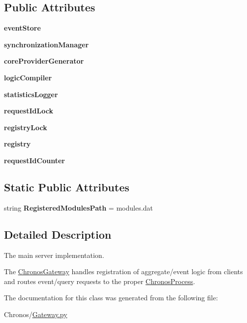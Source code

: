 \subsection*{Public Attributes}
\begin{DoxyCompactItemize}
\item 
{\bfseries event\+Store}
\item 
{\bfseries synchronization\+Manager}
\item 
{\bfseries core\+Provider\+Generator}
\item 
{\bfseries logic\+Compiler}
\item 
{\bfseries statistics\+Logger}
\item 
{\bfseries request\+Id\+Lock}
\item 
{\bfseries registry\+Lock}
\item 
{\bfseries registry}
\item 
{\bfseries request\+Id\+Counter}
\end{DoxyCompactItemize}
\subsection*{Static Public Attributes}
\begin{DoxyCompactItemize}
\item 
string {\bfseries Registered\+Modules\+Path} = \textquotesingle{}modules.\+dat\textquotesingle{}
\end{DoxyCompactItemize}


\subsection{Detailed Description}
The main server implementation. 

The \hyperlink{classChronos_1_1Gateway_1_1ChronosGateway}{Chronos\+Gateway} handles registration of aggregate/event logic from clients and routes event/query requests to the proper \hyperlink{classChronos_1_1Gateway_1_1ChronosProcess}{Chronos\+Process}. 

The documentation for this class was generated from the following file\+:\begin{DoxyCompactItemize}
\item 
Chronos/\hyperlink{Gateway_8py}{Gateway.\+py}\end{DoxyCompactItemize}
